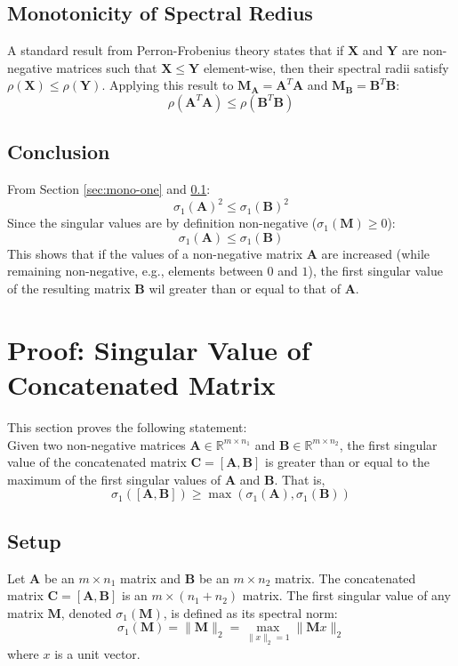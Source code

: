 \subsection{Monotonicity of Spectral Redius}
\label{sec:mono-three}
A standard result from Perron-Frobenius theory states that if $\mathbf{X}$ and
$\mathbf{Y}$ are non-negative matrices such that $\mathbf{X} \leq \mathbf{Y}$
element-wise, then their spectral radii satisfy $\rho(\mathbf{X}) \leq
\rho(\mathbf{Y})$. Applying this result to $\mathbf{M}_{\mathbf{A}} =
\mathbf{A}^T\mathbf{A}$ and $\mathbf{M}_{\mathbf{B}} =
\mathbf{B}^T\mathbf{B}$:
\[ \rho(\mathbf{A}^T\mathbf{A}) \leq \rho(\mathbf{B}^T\mathbf{B}) \]

\subsection{Conclusion}
From Section \ref{sec:mono-one} and \ref{sec:mono-three}:
\[ \sigma_1(\mathbf{A})^2 \leq \sigma_1(\mathbf{B})^2 \]
Since the singular values are by definition non-negative ($\sigma_1(\mathbf{M})
\geq 0$):
\[ \sigma_1(\mathbf{A}) \leq \sigma_1(\mathbf{B}) \]
This shows that if the values of a non-negative matrix $\mathbf{A}$ are
increased (while remaining non-negative, e.g., elements between $0$ and $1$),
the first singular value of the resulting matrix $\mathbf{B}$ wil greater than
or equal to that of $\mathbf{A}$.

\section{Proof: Singular Value of Concatenated Matrix}
\label{sec:app-concatenate}
This section proves the following statement:\\
Given two non-negative matrices $\mathbf{A} \in \mathbb{R}^{m \times n_1}$ and
$\mathbf{B} \in \mathbb{R}^{m \times n_2}$, the first singular value of the
concatenated matrix $\mathbf{C} = [\mathbf{A}, \mathbf{B}]$ is greater than or
equal to the maximum of the first singular values of $\mathbf{A}$ and
$\mathbf{B}$. That is,
\[ \sigma_1([\mathbf{A}, \mathbf{B}]) \geq \max(\sigma_1(\mathbf{A}),
\sigma_1(\mathbf{B})) \]

\subsection{Setup}
Let $\mathbf{A}$ be an $m \times n_1$ matrix and $\mathbf{B}$ be an $m \times
n_2$ matrix. The concatenated matrix $\mathbf{C} = [\mathbf{A}, \mathbf{B}]$ is
an $m \times (n_1 + n_2)$ matrix. The first singular value of any matrix
$\mathbf{M}$, denoted $\sigma_1(\mathbf{M})$, is defined as its spectral norm:
\[ \sigma_1(\mathbf{M}) = \parallel \mathbf{M} \parallel_2 = \max_{\parallel x
\parallel_2 = 1} \parallel \mathbf{M}x \parallel_2 \]
where $x$ is a unit vector.

